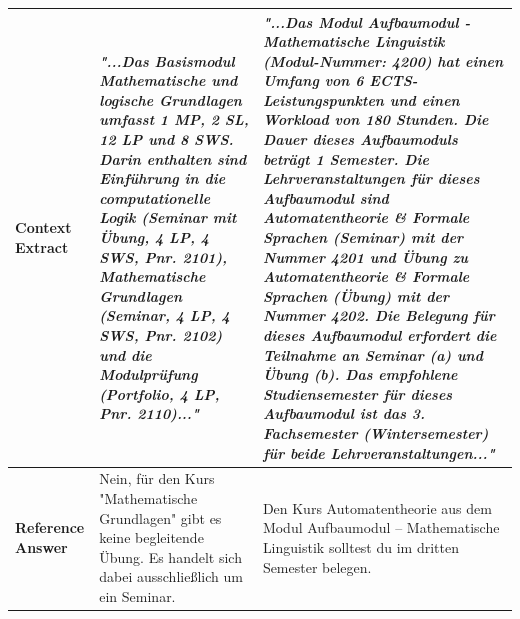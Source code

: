 \documentclass[12pt]{article} %
\begin{document}
\begin{table}[htbp]
\begin{tabularx}{\textwidth}{l X X}
        \midrule
        \textbf{Context Extract}                                                                                                                                                                                                                                                                                                                &
        \textit{"...Das Basismodul Mathematische und logische Grundlagen umfasst 1 MP, 2 SL, 12 LP und 8 SWS. Darin enthalten sind Einf\"uhrung in die computationelle Logik (Seminar mit \"Ubung, 4 LP, 4 SWS, Pnr. 2101), Mathematische Grundlagen (Seminar, 4 LP, 4 SWS, Pnr. 2102) und die Modulpr\"ufung (Portfolio, 4 LP, Pnr. 2110)..."} &
        \textit{"...Das Modul Aufbaumodul - Mathematische Linguistik (Modul-Nummer: 4200) hat einen Umfang von 6 ECTS-Leistungspunkten und einen Workload von 180 Stunden. Die Dauer dieses Aufbaumoduls betr\"agt 1 Semester. Die Lehrveranstaltungen f\"ur dieses Aufbaumodul sind Automatentheorie \& Formale Sprachen (Seminar) mit der Nummer 4201 und \"Ubung zu Automatentheorie \& Formale Sprachen (\"Ubung) mit der Nummer 4202. Die Belegung f\"ur dieses Aufbaumodul erfordert die Teilnahme an Seminar (a) und \"Ubung (b). Das empfohlene Studiensemester f\"ur dieses Aufbaumodul ist das 3. Fachsemester (Wintersemester) f\"ur beide Lehrveranstaltungen..."} \\
        \midrule
        \textbf{Reference Answer}                                                                                                                                                                                                                                                                                                               &
        Nein, f\"ur den Kurs "Mathematische Grundlagen" gibt es keine begleitende \"Ubung. Es handelt sich dabei ausschlie\ss{}lich um ein Seminar.                                                                                                                                                                                             &
        Den Kurs Automatentheorie aus dem Modul Aufbaumodul -- Mathematische Linguistik solltest du im dritten Semester belegen.                                                                                                                                                                                                                                                                                                                                                                                                                                                                                                                                               \\

\end{tabularx}
\end{table}
\end{document}
